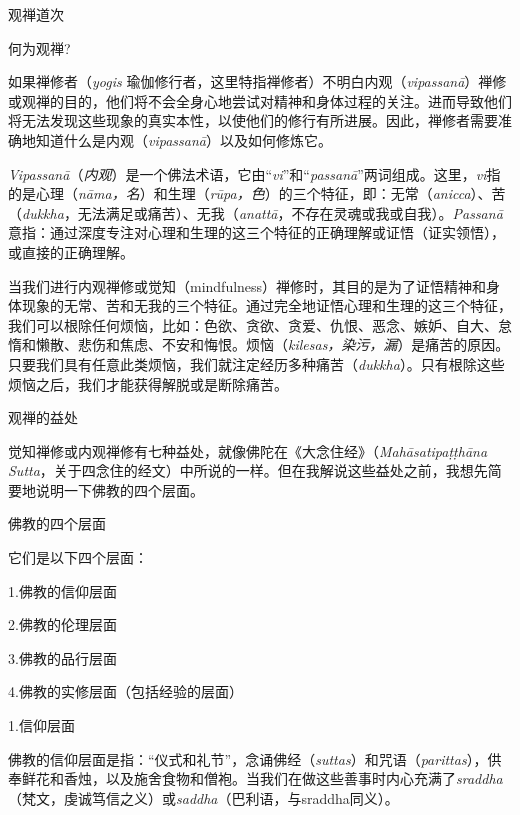


\beginchapter 观禅道次


\subsectnon \1何为观禅?

如果禅修者（{\it yogis} 瑜伽修行者，这里特指禅修者）不明白内观（{\it vipassan\=a\/}）禅修或观禅的目的，他们将不会全身心地尝试对精神和身体过程的关注。进而导致他们将无法发现这些现象的真实本性，以使他们的修行有所进展。因此，禅修者需要准确地知道什么是内观（{\it vipassan\=a}）以及如何修炼它。

{\it Vipassan\=a\/}（{\it 内观}）是一个佛法术语，它由“{\it vi}”和“{\it passan\=a}”两词组成。这里，{\it vi}指的是心理（{\it n\=ama，名}）和生理（{\it r\=upa，色}）的三个特征，即：无常（{\it anicca}）、苦（{\it dukkha}，无法满足或痛苦）、无我（{\it anatt\=a}，不存在灵魂或我或自我）。{\it Passan\=a}意指：通过深度专注对心理和生理的这三个特征的正确理解或证悟（证实领悟），或直接的正确理解。

当我们进行内观禅修或觉知（mindfulness）禅修时，其目的是为了证悟精神和身体现象的无常、苦和无我的三个特征。通过完全地证悟心理和生理的这三个特征，我们可以根除任何烦恼，比如：色欲、贪欲、贪爱、仇恨、恶念、嫉妒、自大、怠惰和懒散、悲伤和焦虑、不安和悔恨。烦恼（{\it kilesas，染污，漏}）是痛苦的原因。只要我们具有任意此类烦恼，我们就注定经历多种痛苦\1（{\it dukkha}）。只有根除这些烦恼之后，我们才能获得解脱或是断除痛苦。

\subsectnon 观禅的益处

觉知禅修或内观禅修有七种益处，就像佛陀在《大念住经》（{\it Mah\=asatipa\d t\d th\=ana Sutta}，关于四念住的经文）中所说的一样。但在我解说这些益处之前，我想先简要地说明一下佛教的四个层面。

\ssubsectnon 佛教的四个层面

它们是以下四个层面：
\smallskip

{
\leftskip=1.6pc
\item{1.}佛教的信仰层面
\item{2.}佛教的伦理层面
\item{3.}佛教的品行层面
\item{4.}佛教的实修层面（包括经验的层面）

}
\bigskip

\sssubsectnon 1.信仰层面

佛教的信仰层面是指：“仪式和礼节”，念诵佛经（{\it suttas}）和咒语（{\it parittas}），供奉鲜花和香烛，以及施舍食物和僧袍。当我们在做这些善事时内心充满了{\it sraddha}（梵文，虔诚笃信之义）或{\it saddha}（巴利语，与sraddha同义）。

